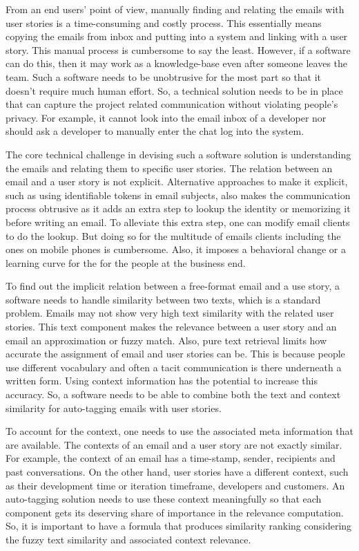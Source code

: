 From an end users' point of view, manually finding and relating the emails with user stories is a time-consuming and costly process. This essentially means copying the emails from inbox and putting into a system and linking with a user story. This manual process is cumbersome to say the least. However, if a software can do this, then it may work as a knowledge-base even after someone leaves the team. Such a software needs to be unobtrusive for the most part so that it doesn't require much human effort. So, a technical solution needs to be in place that can capture the project related communication without violating people's privacy. For example, it cannot look into the email inbox of a developer nor should ask a developer to manually enter the chat log into the system.  

The core technical challenge in devising such a software solution is understanding the emails and relating them to specific user stories. The relation between an email and a user story is not explicit. Alternative approaches to make it explicit, such as using identifiable tokens in email subjects, also makes the communication process obtrusive as it adds an extra step to lookup the identity or memorizing it before writing an email. To alleviate this extra step, one can modify email clients to do the lookup. But doing so for the multitude of emails clients including the ones on mobile phones is cumbersome. Also, it imposes a behavioral change or a learning curve for the for the people at the business end.

To find out the implicit relation between a free-format email and a use story, a software needs to handle similarity between two texts, which is a standard problem. Emails may not show very high text similarity with the related user stories. This text component makes the relevance between a user story and an email an approximation or fuzzy match. Also, pure text retrieval limits how accurate the assignment of email and user stories can be. This is because people use different vocabulary and often a tacit communication is there underneath a written form. Using context information has the potential to increase this accuracy. So, a software needs to be able to combine both the text and context similarity for auto-tagging emails with user stories.

To account for the context, one needs to use the associated meta information that are available. The contexts of an email and a user story are not exactly similar. For example, the context of an email has a time-stamp, sender, recipients and past conversations. On the other hand, user stories have a different context, such as their development time or iteration timeframe, developers and customers. An auto-tagging solution needs to use these context meaningfully so that each component gets its deserving share of importance in the relevance computation. So, it is important to have a formula that produces similarity ranking considering the fuzzy text similarity and associated context relevance.


